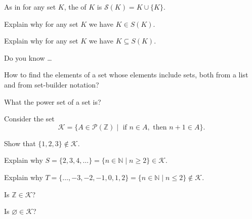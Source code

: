 \begin{exer}[\exerU] %
\label{exer_set_element_and_subset_successor}
    As in  for any set $K$, the  of $K$ is $\mathscr{S}(K)= K \cup \{K\}$.
    \begin{exerpart}
        \item Explain why for any set $K$ we have $K \in S(K)$.
        \item Explain why for any set $K$ we have $K \subseteq S(K)$.
    \end{exerpart}
\end{exer}

\begin{exer}[\exerR] %
\label{exer_dyk_sets_of_sets}
    Do you know \ldots
        \begin{exerpart}
            \item How to find the elements of a set whose elements include sets, both from a list and from set-builder notation?
          \item What the power set of a set is?
        \end{exerpart}
\end{exer}

\begin{exer}[\exerE] %
\label{exer_set_of_inductive_subsets}
    Consider the set $$\mathscr{K} = \{A \in \mathscr{P}(\mathbb{Z}) \mid \text{ if } n \in A, \text{ then } n+1 \in A\}.$$ 
        \begin{exerpart}
            \item Show that $\{1,2,3\} \notin \mathscr{K}$.
            \item Explain why $S = \{2,3,4,\ldots\}=\{n \in \mathbb{N} \mid n \ge 2\} \in \mathscr{K}$.
            \item Explain why $T = \{ \ldots, -3, -2, -1, 0, 1, 2\} = \{n \in \mathbb{N} \mid n \le 2\} \notin \mathscr{K}$.
            \item Is $\mathbb{Z} \in \mathscr{K}$?
            \item Is $\varnothing \in \mathscr{K}$?
        \end{exerpart}
\end{exer}

